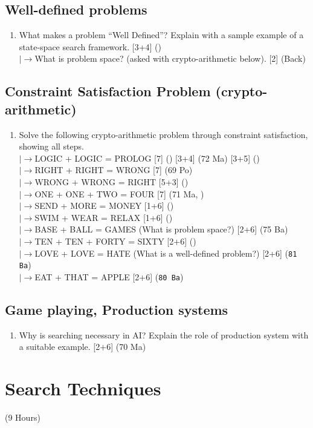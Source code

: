 \documentclass[12pt]{article}
\newcommand{\lb}{\\$\left|\rightarrow\right.$}
\begin{document}
  \subsection{Well-defined problems}
    \begin{enumerate}[topsep=0pt, noitemsep]
      \item What makes a problem ``Well Defined''? Explain with a sample example of a state-space search framework. \hfill [3+4] ()
        \lb What is problem space? (asked with crypto-arithmetic below). \hfill [2] (Back)
    \end{enumerate}

  \subsection{Constraint Satisfaction Problem (crypto-arithmetic)}
    \begin{enumerate}[topsep=0pt, noitemsep]
      \item Solve the following crypto-arithmetic problem through constraint satisfaction, showing all steps.
        \lb LOGIC + LOGIC = PROLOG \hfill [7] () [3+4] (72 Ma) [3+5] ()
        \lb RIGHT + RIGHT = WRONG \hfill [7] (69 Po)
        \lb WRONG + WRONG = RIGHT \hfill [5+3] ()
        \lb ONE + ONE + TWO = FOUR \hfill [7] (71 Ma, )
        \lb SEND + MORE = MONEY \hfill [1+6] ()
        \lb SWIM + WEAR = RELAX \hfill [1+6] ()
        \lb BASE + BALL = GAMES (What is problem space?) \hfill [2+6] (75 Ba)
        \lb TEN + TEN + FORTY = SIXTY \hfill [2+6] ()
        \lb LOVE + LOVE = HATE (What is a well-defined problem?) \hfill [2+6] (\texttt{81 Ba})
        \lb EAT + THAT = APPLE \hfill [2+6] (\texttt{80 Ba})
    \end{enumerate}

  \subsection{Game playing, Production systems}
    \begin{enumerate}[topsep=0pt, noitemsep]
      \item Why is searching necessary in AI? Explain the role of production system with a suitable example. \hfill [2+6] (70 Ma)
    \end{enumerate}

\pagebreak
\section{Search Techniques}
\begin{center}(9 Hours)\end{center}
\end{document}

